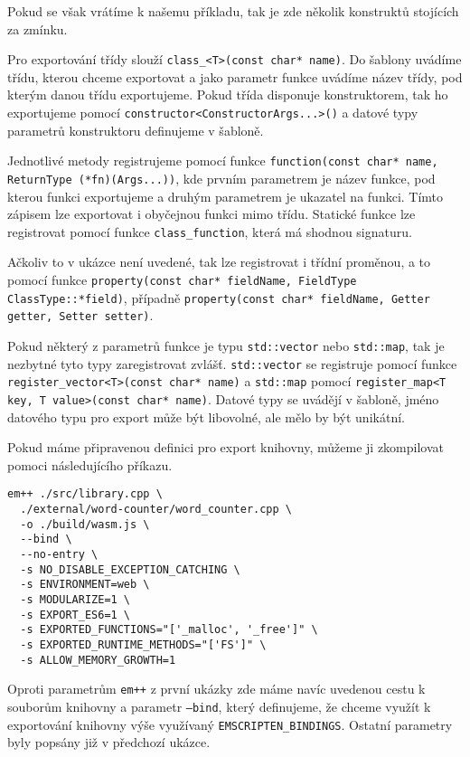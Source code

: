 \documentclass{{template/ctuthesis}}
\begin{document}
Pokud se však vrátíme k našemu příkladu, tak je zde několik konstruktů stojících za zmínku. 

Pro exportování třídy slouží \texttt{class\_<T>(const char* name)}. Do šablony uvádíme třídu, kterou chceme exportovat a jako parametr funkce uvádíme název třídy, pod kterým danou třídu exportujeme. Pokud třída disponuje konstruktorem, tak ho exportujeme pomocí \texttt{constructor<ConstructorArgs...>()} a datové typy parametrů konstruktoru definujeme v šabloně.

Jednotlivé metody registrujeme pomocí funkce \texttt{function(const char* name, ReturnType (*fn)(Args...))}, kde prvním parametrem je název funkce, pod kterou funkci exportujeme a druhým parametrem je ukazatel na funkci. Tímto zápisem lze exportovat i obyčejnou funkci mimo třídu. Statické funkce lze registrovat pomocí funkce \texttt{class\_function}, která má shodnou signaturu.

Ačkoliv to v ukázce není uvedené, tak lze registrovat i třídní proměnou, a to pomocí funkce \texttt{property(const char* fieldName, FieldType ClassType::*field)}, případně \texttt{property(const char* fieldName, Getter getter, Setter setter)}.

Pokud některý z parametrů funkce je typu \texttt{std::vector} nebo \texttt{std::map}, tak je nezbytné tyto typy zaregistrovat zvlášť. \texttt{std::vector} se registruje pomocí funkce \texttt{register\_vector<T>(const char* name)} a \texttt{std::map} pomocí \texttt{register\_map<T key, T value>(const char* name)}. Datové typy se uvádějí v šabloně, jméno datového typu pro export může být libovolné, ale mělo by být unikátní.

Pokud máme připravenou definici pro export knihovny, můžeme ji zkompilovat pomoci následujícího příkazu.

\begin{verbatim}
em++ ./src/library.cpp \
  ./external/word-counter/word_counter.cpp \
  -o ./build/wasm.js \
  --bind \
  --no-entry \
  -s NO_DISABLE_EXCEPTION_CATCHING \
  -s ENVIRONMENT=web \
  -s MODULARIZE=1 \
  -s EXPORT_ES6=1 \
  -s EXPORTED_FUNCTIONS="['_malloc', '_free']" \
  -s EXPORTED_RUNTIME_METHODS="['FS']" \
  -s ALLOW_MEMORY_GROWTH=1
\end{verbatim}

Oproti parametrům \texttt{em++} z první ukázky zde máme navíc uvedenou cestu k souborům knihovny a parametr \texttt{--bind}, který definujeme, že chceme využít k exportování knihovny výše využívaný \texttt{EMSCRIPTEN\_BINDINGS}. Ostatní parametry byly popsány již v předchozí ukázce.
\end{document}
